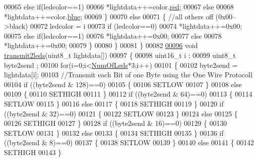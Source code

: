 \begin{DoxyCode}
00065             \textcolor{keywordflow}{else} \textcolor{keywordflow}{if}(ledcolor==1)
00066                 *lightdata++=color.\hyperlink{structcolor24bit_ad47d918910aaa51c73160ac85999d09c}{red};
00067             \textcolor{keywordflow}{else}
00068                 *lightdata++=color.\hyperlink{structcolor24bit_a287b397e90d7b995c81ff54e741f96b2}{blue};
00069         \}
00070         \textcolor{keywordflow}{else}
00071         \{   \textcolor{comment}{//all others off (0x00-->black)}
00072             ledcolor = i%
00073             \textcolor{keywordflow}{if} (ledcolor==0)
00074                 *lightdata++=0x00;
00075             \textcolor{keywordflow}{else} \textcolor{keywordflow}{if}(ledcolor==1)
00076                 *lightdata++=0x00;
00077             \textcolor{keywordflow}{else}
00078                 *lightdata++=0x00;
00079         \}   
00080     \}   
00081 \}
00082 
\hypertarget{_lightstribe_8c_source_l00096}{}\hyperlink{_lightstribe_8h_aac724dad670e4a26723daf71ce6a8d8a}{00096} \textcolor{keywordtype}{void} \hyperlink{_lightstribe_8c_aac724dad670e4a26723daf71ce6a8d8a}{transmit2leds}(uint8\_t lightdata[])
00097 \{
00098     uint16\_t i ;
00099     uint8\_t byte2send ;
00100     \textcolor{keywordflow}{for}(i=0;i<\hyperlink{globals_8h_ad5db4045aed262ed4aae2af9d81fab98}{NumOfLeds}*3;i++)
00101     \{
00102         byte2send = lightdata[i];   
00103         \textcolor{comment}{//Transmit each Bit of one Byte using the One Wire Protocoll}
00104         \textcolor{keywordflow}{if} ((byte2send & 128)==0)
00105         \{
00106             SETLOW
00107         \}
00108         \textcolor{keywordflow}{else}
00109         \{
00110             SETHIGH
00111         \}
00112         \textcolor{keywordflow}{if} ((byte2send & 64)==0)
00113         \{
00114             SETLOW
00115         \}
00116         \textcolor{keywordflow}{else}
00117         \{
00118             SETHIGH
00119         \}
00120         \textcolor{keywordflow}{if} ((byte2send & 32)==0)
00121         \{
00122             SETLOW
00123         \}
00124         \textcolor{keywordflow}{else}
00125         \{
00126             SETHIGH
00127         \}
00128         \textcolor{keywordflow}{if} ((byte2send & 16)==0)
00129         \{
00130             SETLOW
00131         \}
00132         \textcolor{keywordflow}{else}
00133         \{
00134             SETHIGH
00135         \}
00136         \textcolor{keywordflow}{if} ((byte2send & 8)==0)
00137         \{
00138             SETLOW
00139         \}
00140         \textcolor{keywordflow}{else}
00141         \{
00142             SETHIGH
00143         \}

\end{DoxyCode}
